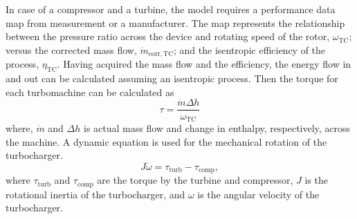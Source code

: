 \documentclass[journal]{IEEEtran}
\begin{document}
In case of a compressor and a turbine, the model requires a performance data map from measurement or a manufacturer. The map represents the relationship between the pressure ratio across the device and rotating speed of the rotor, $\omega_\mathrm{TC}$; versus the corrected mass flow, $\dot{m}_{\mathrm{corr,TC}}$; and the isentropic efficiency of the process, $\eta_{\mathrm{TC}}$. Having acquired the mass flow and the efficiency, the energy flow in and out can be calculated assuming an isentropic process. Then the torque for each turbomachine can be calculated as
\begin{equation}
\tau = \frac{\dot{m} \Delta h}{\omega_\mathrm{TC}}
\end{equation}
where, $\dot{m}$ and $\Delta h$ is actual mass flow and change in enthalpy, respectively, across the machine.
A dynamic equation is used for the mechanical rotation of the turbocharger.
\begin{equation}
J\dot{\omega} = \tau_{\mathrm{turb}} - \tau_{\mathrm{comp}},
\end{equation}
where $\tau_{\mathrm{turb}}$ and $\tau_{\mathrm{comp}}$ are the torque by the turbine and compressor, $J$ is the rotational inertia of the turbocharger, and $\omega$ is the angular velocity of the turbocharger.
\end{document}
